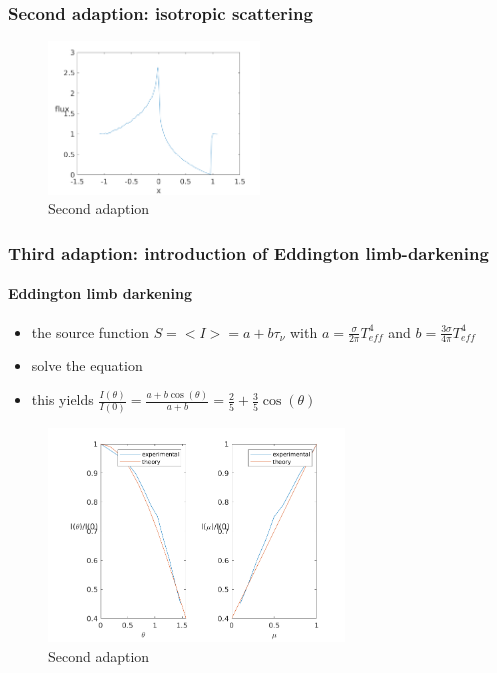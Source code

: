 \documentclass[../main/main.tex]{subfiles}
\begin{document}
\subsubsection{Second adaption: isotropic scattering}
\begin{figure}[!htp]
\centering
\includegraphics[width=0.5\textwidth]{../../introductory_exercises/P_Cygni_profile_UV_resonance/npot6xk0100alpha0beta1test2.png}
\caption{Second adaption}
\end{figure}

\newpage
\subsubsection{Third adaption: introduction of Eddington limb-darkening}
\paragraph{Eddington limb darkening}
\begin{itemize}
\item the source function $S= <I> = a + b\tau_{\nu}$ with $a= \frac{\sigma}{2 \pi}T_{eff}^4$ and $b = \frac{3 \sigma}{4 \pi}T_{eff}^4$
\item solve the equation
\item this yields $\frac{I(\theta)}{I(0)} = \frac{a+b\cos(\theta)}{a+b} = \frac{2}{5} + \frac{3}{5}\cos(\theta)$
\end{itemize}
\begin{figure}[!htp]
\centering
\includegraphics[width=0.7\textwidth]{../../introductory_exercises/P_Cygni_profile_UV_resonance/Eddington_limb_darkening.png}
\caption{Second adaption}
\end{figure}
\end{document}

